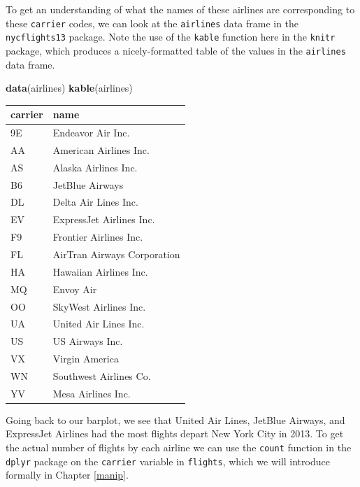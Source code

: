 \documentclass[]{tufte-book}
\newenvironment{Shaded}{\begin{snugshade}}{\end{snugshade}}
\newcommand{\KeywordTok}[1]{\textcolor[rgb]{0.13,0.29,0.53}{\textbf{{#1}}}}
\newcommand{\StringTok}[1]{\textcolor[rgb]{0.31,0.60,0.02}{{#1}}}
\newcommand{\NormalTok}[1]{{#1}}
\begin{document}
To get an understanding of what the names of these airlines are
corresponding to these \texttt{carrier} codes, we can look at the
\texttt{airlines} data frame in the \texttt{nycflights13} package. Note
the use of the \texttt{kable} function here in the \texttt{knitr}
package, which produces a nicely-formatted table of the values in the
\texttt{airlines} data frame.

\begin{Shaded}
\begin{Highlighting}[]
\KeywordTok{data}\NormalTok{(airlines)}
\KeywordTok{kable}\NormalTok{(airlines)}
\end{Highlighting}
\end{Shaded}

\begin{tabular}{l|l}
\hline
carrier & name\\
\hline
9E & Endeavor Air Inc.\\
\hline
AA & American Airlines Inc.\\
\hline
AS & Alaska Airlines Inc.\\
\hline
B6 & JetBlue Airways\\
\hline
DL & Delta Air Lines Inc.\\
\hline
EV & ExpressJet Airlines Inc.\\
\hline
F9 & Frontier Airlines Inc.\\
\hline
FL & AirTran Airways Corporation\\
\hline
HA & Hawaiian Airlines Inc.\\
\hline
MQ & Envoy Air\\
\hline
OO & SkyWest Airlines Inc.\\
\hline
UA & United Air Lines Inc.\\
\hline
US & US Airways Inc.\\
\hline
VX & Virgin America\\
\hline
WN & Southwest Airlines Co.\\
\hline
YV & Mesa Airlines Inc.\\
\hline
\end{tabular}

Going back to our barplot, we see that United Air Lines, JetBlue
Airways, and ExpressJet Airlines had the most flights depart New York
City in 2013. To get the actual number of flights by each airline we can
use the \texttt{count} function in the \texttt{dplyr} package on the
\texttt{carrier} variable in \texttt{flights}, which we will introduce
formally in Chapter \ref{manip}.

\begin{Shaded}
\end{Shaded}
\end{document}
